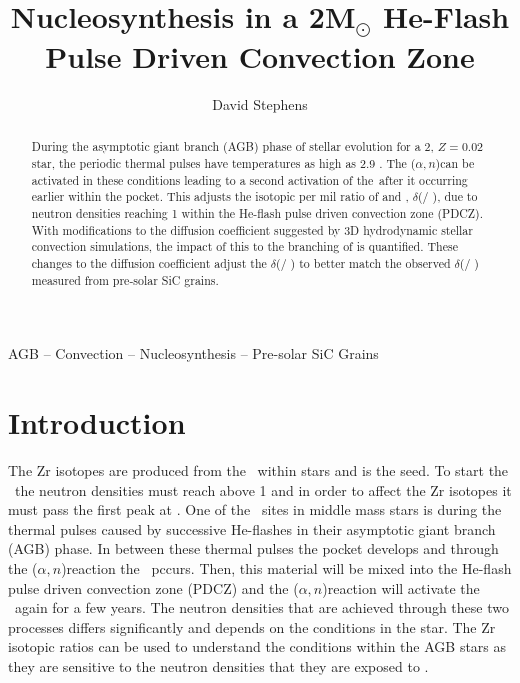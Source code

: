 \documentclass[fleqn,usenatbib]{mnras}
\title[Nucleosynthesis in a 2\Msun He-Flash Pulse Driven Convection Zone]{Nucleosynthesis in a 2M$_{\odot}$ He-Flash Pulse Driven Convection Zone}
\author[D. Stephens]{
David Stephens}
\begin{document}
\label{firstpage}
\pagerange{\pageref{firstpage}--\pageref{lastpage}}
\maketitle

\begin{abstract}
During the asymptotic giant branch (AGB) phase of stellar evolution for a 2\Msun, $Z=0.02$ star, the periodic thermal pulses have temperatures as high as 2.9 \K. The \neon[22]($\alpha,n$)\magnesium[25] can be activated in these conditions leading to a second activation of the\spr~after it occurring earlier within the \carbon[13] pocket. This adjusts the isotopic per mil ratio of \zirconium[96] and \zirconium[94], $\delta$(\zirconium[96] / \zirconium[94]), due to neutron densities reaching 1  within the He-flash pulse driven convection zone (PDCZ). With modifications to the diffusion coefficient suggested by 3D hydrodynamic stellar convection simulations, the impact of this to the branching of \zirconium[95] is quantified. These changes to the diffusion coefficient adjust the $\delta$(\zirconium[96] / \zirconium[94]) to better match the observed $\delta$(\zirconium[96] / \zirconium[94]) measured from pre-solar SiC grains.
\end{abstract}

\begin{keywords}
AGB -- Convection -- Nucleosynthesis -- Pre-solar SiC Grains
\end{keywords}



\section{Introduction}

The Zr isotopes are produced from the \spr~within stars and \iron[56] is the seed. To start the \spr~the neutron densities must reach above 1   and in order to affect the Zr isotopes it must pass the first peak at \strontium[88]. One of the \spr~sites in middle mass stars is during the thermal pulses caused by successive He-flashes in their asymptotic giant branch (AGB) phase. In between these thermal pulses the \carbon[13] pocket develops and through the \carbon[13]($\alpha,n$)\oxygen[16] reaction the \spr~pccurs. Then, this material will be mixed into the He-flash pulse driven convection zone (PDCZ) and the \neon[22]($\alpha,n$)\magnesium[25] reaction will activate the \spr~again for a few years. The neutron densities that are achieved through these two processes differs significantly and depends on the conditions in the star. The Zr isotopic ratios can be used to understand the conditions within the AGB stars as they are sensitive to the neutron densities that they are exposed to \citep{zr}.
\end{document}
